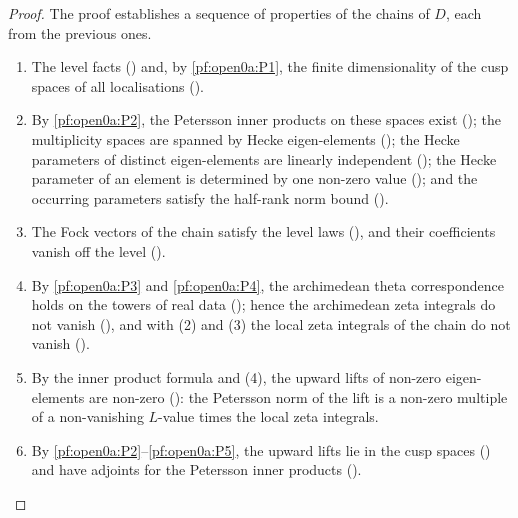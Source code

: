 \begin{proof}
The proof establishes a sequence of properties of the chains of $D$, each from the previous ones.
\begin{enumerate}[label=(\arabic*),leftmargin=*]
\item The level facts () and, by \ref{pf:open0a:P1}, the
finite dimensionality of the cusp spaces of all localisations
().
\item By \ref{pf:open0a:P2}, the Petersson inner products on these spaces exist
(); the multiplicity spaces are spanned by Hecke
eigen-elements (); the Hecke parameters
of distinct eigen-elements are linearly independent
(); the Hecke parameter of an element is
determined by one non-zero value (); and
the occurring parameters satisfy the half-rank norm bound
().
\item The Fock vectors of the chain satisfy the level laws (),
and their coefficients vanish off the level ().
\item By \ref{pf:open0a:P3} and \ref{pf:open0a:P4}, the archimedean theta correspondence holds on the towers of real
data (); hence the archimedean zeta integrals
do not vanish (), and with (2) and (3) the local zeta
integrals of the chain do not vanish ().
\item By the inner product formula and (4), the upward lifts of non-zero eigen-elements are non-zero
(): the Petersson norm of the lift is a non-zero multiple of
a non-vanishing $L$-value times the local zeta integrals.
\item By \ref{pf:open0a:P2}--\ref{pf:open0a:P5}, the upward lifts lie in the cusp spaces
() and have adjoints for the Petersson inner products
().

\end{enumerate}
\end{proof}
